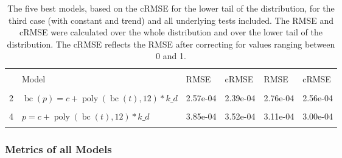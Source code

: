\documentclass[12pt,a4paper]{article}
\DeclareMathOperator{\bc}{bc}
\DeclareMathOperator{\poly}{poly}
\begin{document}
\begin{table}[!h]

\caption{\label{tab:5_best_all_3}\label{tab:best_all_3} The five best models, based on the cRMSE for the lower tail of the distribution, for the third case (with constant and trend) and all underlying tests included. The RMSE and cRMSE were calculated over the whole distribution and over the lower tail of the distribution. The cRMSE reflects the RMSE after correcting for values ranging between 0 and 1.}
\centering
\fontsize{10}{12}\selectfont
\begin{tabular}[t]{ll>{\raggedleft\arraybackslash}p{2cm}>{\raggedleft\arraybackslash}p{2cm}>{\raggedleft\arraybackslash}p{2cm}>{\raggedleft\arraybackslash}p{2cm}}
\toprule
\multicolumn{1}{c}{\textbf{}} & \multicolumn{1}{c}{\textbf{}} & \multicolumn{2}{c}{\textbf{Full Distribution}} & \multicolumn{2}{c}{\textbf{Lower Tail ($p \leq 0.2$)}} \\
\cmidrule(l{3pt}r{3pt}){3-4} \cmidrule(l{3pt}r{3pt}){5-6}
  & Model & RMSE & cRMSE & RMSE & cRMSE\\
\midrule
\cellcolor{gray!6}{1} & \cellcolor{gray!6}{$\bc(p) = c + \poly\left( \bc(t), 13 \right) * k\_d$} & \cellcolor{gray!6}{1.92e-04} & \cellcolor{gray!6}{1.86e-04} & \cellcolor{gray!6}{2.02e-04} & \cellcolor{gray!6}{1.95e-04}\\
2 & $\bc(p) = c + \poly\left( \bc(t), 12 \right) * k\_d$ & 2.57e-04 & 2.39e-04 & 2.76e-04 & 2.56e-04\\
\cellcolor{gray!6}{3} & \cellcolor{gray!6}{$p = c + \poly\left( \bc(t), 13 \right) * k\_d$} & \cellcolor{gray!6}{3.47e-04} & \cellcolor{gray!6}{3.22e-04} & \cellcolor{gray!6}{3.17e-04} & \cellcolor{gray!6}{3.00e-04}\\
4 & $p = c + \poly\left( \bc(t), 12 \right) * k\_d$ & 3.85e-04 & 3.52e-04 & 3.11e-04 & 3.00e-04\\
\cellcolor{gray!6}{5} & \cellcolor{gray!6}{$\log(p) = c + \poly\left( \bc(t), 13 \right) * k\_d$} & \cellcolor{gray!6}{3.41e-04} & \cellcolor{gray!6}{3.06e-04} & \cellcolor{gray!6}{3.77e-04} & \cellcolor{gray!6}{3.37e-04}\\
\bottomrule
\end{tabular}
\end{table}

\FloatBarrier

\hypertarget{metrics-of-all-models}{%
\subsubsection{Metrics of all Models}\label{metrics-of-all-models}}
\end{document}
